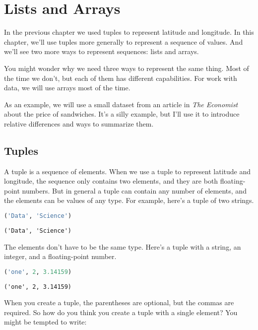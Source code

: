 \chapter{Lists and Arrays}\label{lists-and-arrays}

In the previous chapter we used tuples to represent latitude and
longitude. In this chapter, we'll use tuples more generally to represent
a sequence of values. And we'll see two more ways to represent
sequences: lists and arrays.

You might wonder why we need three ways to represent the same thing.
Most of the time we don't, but each of them has different capabilities.
For work with data, we will use arrays most of the time.

As an example, we will use a small dataset from an article in \emph{The
Economist} about the price of sandwiches. It's a silly example, but I'll
use it to introduce relative differences and ways to summarize them.

\section{Tuples}\label{tuples}

A tuple is a sequence of elements. When we use a tuple to represent
latitude and longitude, the sequence only contains two elements, and
they are both floating-point numbers. But in general a tuple can contain
any number of elements, and the elements can be values of any type. For
example, here's a tuple of two strings.

\begin{lstlisting}[language=Python,style=source]
('Data', 'Science')
\end{lstlisting}

\begin{lstlisting}[style=output]
('Data', 'Science')
\end{lstlisting}

The elements don't have to be the same type. Here's a tuple with a
string, an integer, and a floating-point number.

\begin{lstlisting}[language=Python,style=source]
('one', 2, 3.14159)
\end{lstlisting}

\begin{lstlisting}[style=output]
('one', 2, 3.14159)
\end{lstlisting}

When you create a tuple, the parentheses are optional, but the commas
are required. So how do you think you create a tuple with a single
element? You might be tempted to write:

